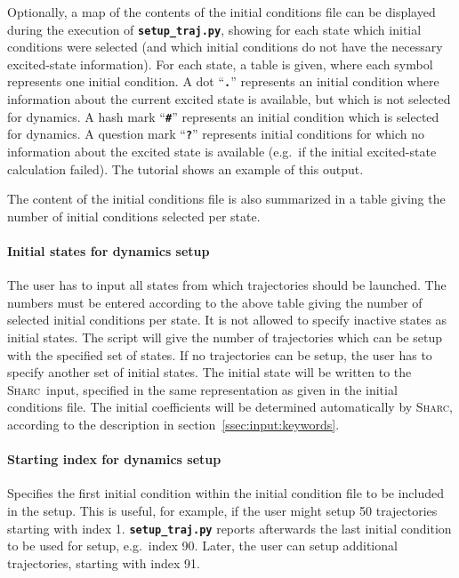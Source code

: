 \documentclass[a4paper,10pt,DIV=15,openany,twoside=false]{scrbook}
\newcommand{\sharc}{\textsc{Sharc}}
\newcommand{\ttt}[1]{\textbf{\texttt{#1}}}
\begin{document}
Optionally, a map of the contents of the initial conditions file can be displayed during the execution of \ttt{setup\_traj.py}, showing for each state which initial conditions were selected (and which initial conditions do not have the necessary excited-state information). For each state, a table is given, where each symbol represents one initial condition. A dot ``\ttt{.}'' represents an initial condition where information about the current excited state is available, but which is not selected for dynamics. A hash mark ``\ttt{\#}'' represents an initial condition which is selected for dynamics. A question mark ``\ttt{?}'' represents initial conditions for which no information about the excited state is available (e.g.\ if the initial excited-state calculation failed). The tutorial shows an example of this output.

The content of the initial conditions file is also summarized in a table giving the number of initial conditions selected per state. 

\paragraph{Initial states for dynamics setup}

The user has to input all states from which trajectories should be launched. The numbers must be entered according to the above table giving the number of selected initial conditions per state. It is not allowed to specify inactive states as initial states. The script will give the number of trajectories which can be setup with the specified set of states. If no trajectories can be setup, the user has to specify another set of initial states. The initial state will be written to the \sharc\ input, specified in the same representation as given in the initial conditions file. The initial coefficients will be determined automatically by \sharc, according to the description in section~\ref{ssec:input:keywords}.

\paragraph{Starting index for dynamics setup}

Specifies the first initial condition within the initial condition file to be included in the setup. This is useful, for example, if the user might setup 50 trajectories starting with index 1. \ttt{setup\_traj.py} reports afterwards the last initial condition to be used for setup, e.g.\ index 90. Later, the user can setup additional trajectories, starting with index 91.
\end{document}
